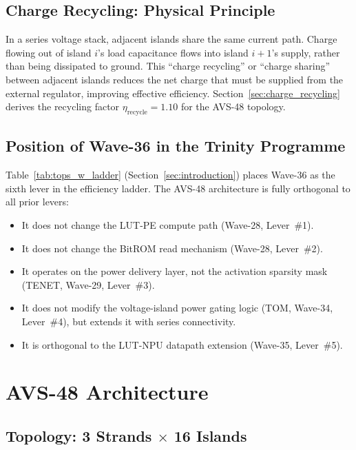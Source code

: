 \subsection{Charge Recycling: Physical Principle}

In a series voltage stack, adjacent islands share the same current path.
Charge flowing out of island $i$'s load capacitance flows into island
$i+1$'s supply, rather than being dissipated to ground.  This
``charge recycling'' or ``charge sharing'' between adjacent islands
reduces the net charge that must be supplied from the external
regulator, improving effective efficiency.  Section~\ref{sec:charge_recycling}
derives the recycling factor $\eta_\mathrm{recycle} = 1.10$ for the
AVS-48 topology.

\subsection{Position of Wave-36 in the Trinity Programme}

Table~\ref{tab:tops_w_ladder} (Section~\ref{sec:introduction}) places
Wave-36 as the sixth lever in the efficiency ladder.  The AVS-48
architecture is fully orthogonal to all prior levers:
\begin{itemize}
  \item It does not change the LUT-PE compute path (Wave-28, Lever~\#1).
  \item It does not change the BitROM read mechanism (Wave-28, Lever~\#2).
  \item It operates on the power delivery layer, not the activation
    sparsity mask (TENET, Wave-29, Lever~\#3).
  \item It does not modify the voltage-island power gating logic
    (TOM, Wave-34, Lever~\#4), but extends it with series connectivity.
  \item It is orthogonal to the LUT-NPU datapath extension
    (Wave-35, Lever~\#5).
\end{itemize}

\section{AVS-48 Architecture}
\label{sec:avs48_architecture}

\subsection{Topology: 3 Strands $\times$ 16 Islands}

